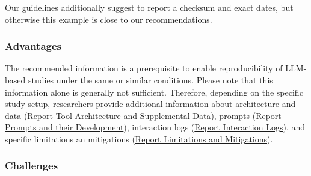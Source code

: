 Our guidelines additionally suggest to report a checksum and exact dates, but otherwise this example is close to our recommendations. 



\subsubsection{Advantages}

The recommended information is a prerequisite to enable reproducibility of LLM-based studies under the same or similar conditions.
Please note that this information alone is generally not sufficient.
Therefore, depending on the specific study setup, researchers \should provide additional information about architecture and data (\href{/guidelines/#report-tool-architecture-and-supplemental-data}{Report Tool Architecture and Supplemental Data}), prompts (\href{/guidelines/#report-prompts-and-their-development}{Report Prompts and their Development}), interaction logs (\href{/guidelines//#report-interaction-logs}{Report Interaction Logs}), and specific limitations an mitigations (\href{/guidelines/#report-limitations-and-mitigations}{Report Limitations and Mitigations}).

\subsubsection{Challenges}

